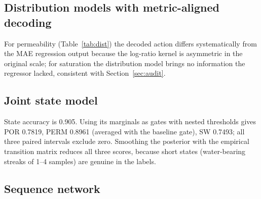 \documentclass[preprint,12pt]{elsarticle}
\begin{document}
\subsection{Distribution models with metric-aligned decoding}

\begin{table}[t]
\centering
\caption{Distribution models decoded with the official kernel, evaluated with the baseline gates (5-fold CV).}
\label{tab:dist}
\small
{}
\end{table}

For permeability (Table~\ref{tab:dist}) the decoded action differs systematically from the MAE regression output because the log-ratio kernel is asymmetric in the original scale; for saturation the distribution model brings no information the regressor lacked, consistent with Section~\ref{sec:audit}.

\subsection{Joint state model}

State accuracy is 0.905. Using its marginals as gates with nested thresholds gives POR 0.7819, PERM 0.8961 (averaged with the baseline gate), SW 0.7493; all three paired intervals exclude zero. Smoothing the posterior with the empirical transition matrix reduces all three scores, because short states (water-bearing streaks of 1--4 samples) are genuine in the labels.

\subsection{Sequence network}
\end{document}
